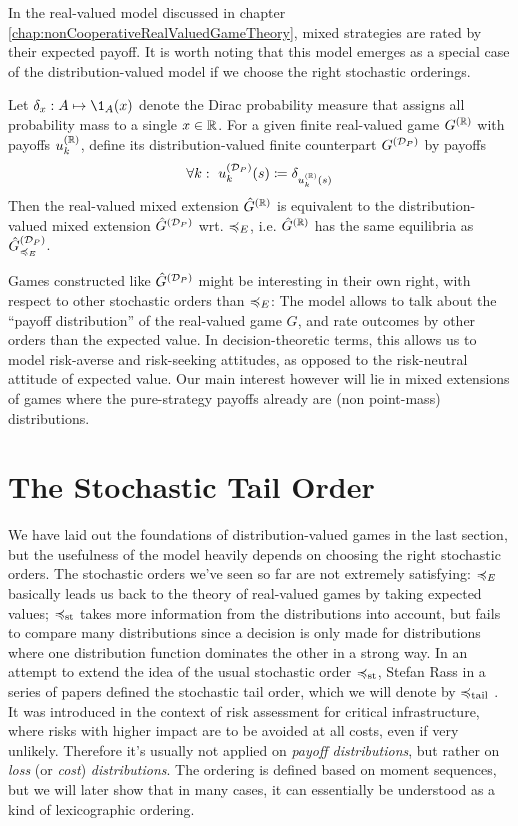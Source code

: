 \documentclass[a4paper]{scrreprt}
\begin{document}
    In the real-valued model discussed in chapter \ref{chap:nonCooperativeRealValuedGameTheory}, mixed strategies are rated by their expected payoff. It is worth noting that this model emerges as a special case of the distribution-valued model if we choose the right stochastic orderings.
    \begin{ex}
        Let $\delta_x: A \mapsto \1_A(x)$ denote the Dirac probability measure that assigns all probability mass to a single $x \in \mathbb{R}$.
        For a given finite real-valued game $G^{(\mathbb{R})}$ with payoffs $u_k^{(\mathbb{R})}$, define its distribution-valued finite counterpart $G^{(\mathcal{D}_P)}$ by payoffs
        \begin{gather*}
            \forall k: ~u_k^{(\mathcal{D}_P)}(s) \coloneqq \delta_{u_k^{(\mathbb{R})}(s)} 
        \end{gather*}
        Then the real-valued mixed extension $\hat{G}^{(\mathbb{R})}$ is equivalent to the distribution-valued mixed extension $\hat{G}^{(\mathcal{D}_P)}$ wrt. $\preccurlyeq_E$, i.e. 
        $\hat{G}^{(\mathbb{R})}$ has the same equilibria as $\hat{G}^{(\mathcal{D}_P)}_{\preccurlyeq_E}$.
    \end{ex}
    Games constructed like $\hat{G}^{(\mathcal{D}_P)}$ might be interesting in their own right, with respect to other stochastic orders than $\preccurlyeq_E$:
    The model allows to talk about the “payoff distribution” of the real-valued game $G$, and rate outcomes by other orders than the expected value. In decision-theoretic terms, this allows us to model risk-averse and risk-seeking attitudes, as opposed to the risk-neutral attitude of expected value. Our main interest however will lie in mixed extensions of games where the pure-strategy payoffs already are (non point-mass) distributions.

    
    \section{The Stochastic Tail Order}
    We have laid out the foundations of distribution-valued games in the last section, but the usefulness of the model heavily depends on choosing the right stochastic orders.
    The stochastic orders we've seen so far are not extremely satisfying: $\preccurlyeq_E$ basically leads us back to the theory of real-valued games by taking expected values; $\preccurlyeq_{\text{st}}$ takes more information from the distributions into account, but fails to compare many distributions since a decision is only made for distributions where one distribution function dominates the other in a strong way.
    In an attempt to extend the idea of the usual stochastic order $\preccurlyeq_{\text{st}}$, Stefan Rass in a series of papers defined the stochastic tail order, which we will denote by $\preccurlyeq_{\text{tail}}$ \cite{bib:rassGameRiskManagI,bib:rassGameRiskManagII,bib:rassTotalOrderingOnLossDistributions}.
    It was introduced in the context of risk assessment for critical infrastructure, where risks with higher impact are to  be avoided at all costs, even if very unlikely.
    Therefore it's usually not applied on \emph{payoff distributions}, but rather on \emph{loss} (or \emph{cost}) \emph{distributions}.
    The ordering is defined based on moment sequences, but we will later show that in many cases, it can essentially be understood as a kind of lexicographic ordering.
\end{document}
